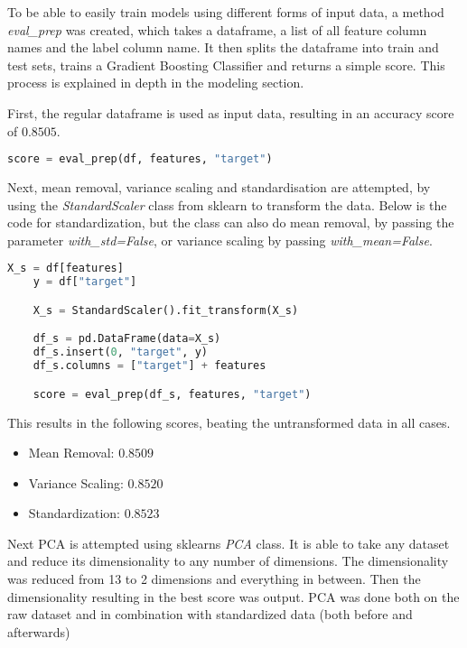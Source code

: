 To be able to easily train models using different forms of input data, a method \emph{eval\_prep} was created,
which takes a dataframe, a list of all feature column names and the label column name. It then splits the dataframe
into train and test sets, trains a Gradient Boosting Classifier and returns a simple score.
This process is explained in depth in the modeling section.

First, the regular dataframe is used as input data, resulting in an accuracy score of $0.8505$.

\begin{lstlisting}[language=Python]
    score = eval_prep(df, features, "target")
\end{lstlisting}
Next, mean removal, variance scaling and standardisation are attempted, by using the \emph{StandardScaler}
class from sklearn to transform the data. Below is the code for standardization, but the class can also do
mean removal, by passing the parameter \emph{with\_std=False}, or variance scaling by passing \emph{with\_mean=False}.

\begin{lstlisting}[language=Python]
    X_s = df[features]
    y = df["target"]

    X_s = StandardScaler().fit_transform(X_s)

    df_s = pd.DataFrame(data=X_s)
    df_s.insert(0, "target", y)
    df_s.columns = ["target"] + features

    score = eval_prep(df_s, features, "target")
\end{lstlisting}

This results in the following scores, beating the untransformed data in all cases.

\begin{itemize}
    \item Mean Removal: $0.8509$
    \item Variance Scaling: $0.8520$
    \item Standardization: $0.8523$
\end{itemize}

Next \ac{PCA} is attempted using sklearns \emph{PCA} class. It is able to take any dataset and reduce
its dimensionality to any number of dimensions. The dimensionality was reduced from 13 to 2 dimensions
and everything in between. Then the dimensionality resulting in the best score was output.
\ac{PCA} was done both on the raw dataset and in combination with standardized data (both before and afterwards)

